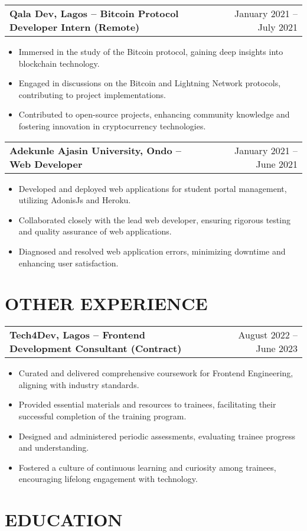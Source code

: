 \documentclass[a4paper,12pt]{article}
\makeatletter
\newenvironment{joblong}[2]
    {
    \begin{tabularx}{\linewidth}{@{}l X r@{}}
    \textbf{#1} & \hfill &  #2 \\[3.75pt]
    \end{tabularx}
    \begin{minipage}[t]{\linewidth}
    \begin{itemize}[nosep,after=\strut, leftmargin=1em, itemsep=3pt,label=--]
    }
    {
    \end{itemize}
    \end{minipage}    
    }
\makeatother
\begin{document}
\begin{joblong}{Qala Dev, Lagos -- Bitcoin Protocol Developer Intern (Remote)}{January 2021 -- July 2021}
\item Immersed in the study of the Bitcoin protocol, gaining deep insights into blockchain technology.
\item Engaged in discussions on the Bitcoin and Lightning Network protocols, contributing to project implementations.
\item Contributed to open-source projects, enhancing community knowledge and fostering innovation in cryptocurrency technologies.
\end{joblong}

\begin{joblong}{Adekunle Ajasin University, Ondo -- Web Developer}{January 2021 -- June 2021}
\item Developed and deployed web applications for student portal management, utilizing AdonisJs and Heroku.
\item Collaborated closely with the lead web developer, ensuring rigorous testing and quality assurance of web applications.
\item Diagnosed and resolved web application errors, minimizing downtime and enhancing user satisfaction.
\end{joblong}

\section{OTHER EXPERIENCE}

\begin{joblong}{Tech4Dev, Lagos -- Frontend Development Consultant (Contract)}{August 2022 -- June 2023}
\item Curated and delivered comprehensive coursework for Frontend Engineering, aligning with industry standards.
\item Provided essential materials and resources to trainees, facilitating their successful completion of the training program.
\item Designed and administered periodic assessments, evaluating trainee progress and understanding.
\item Fostered a culture of continuous learning and curiosity among trainees, encouraging lifelong engagement with technology.
\end{joblong}


\section{EDUCATION}
\end{document}
